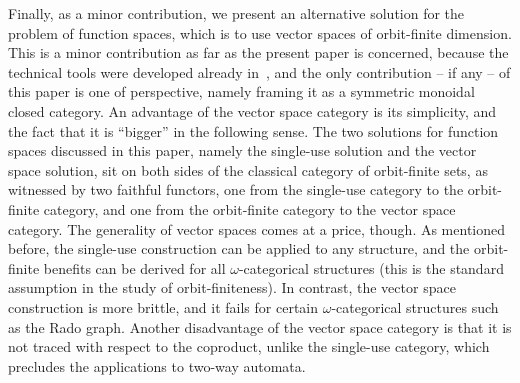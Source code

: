 Finally, as a minor contribution, we present an alternative solution for the problem of function spaces, which is  to use vector spaces of orbit-finite dimension. This is a minor contribution as far as the present paper is concerned, because the technical tools were developed already in~\cite{bojanczykKM21OrbitFiniteVector}, and the only contribution -- if any -- of this paper is one of perspective, namely framing it as a symmetric monoidal closed category. An advantage of the vector space category is its simplicity, and the fact that it is ``bigger'' in the following sense. The two solutions for function spaces discussed in this paper, namely the single-use solution and the vector space solution, sit on both sides of the classical category of orbit-finite sets, as witnessed by two faithful functors, one from the single-use category to the orbit-finite category, and one from the orbit-finite category to the vector space category. 
The generality of vector spaces comes at a price, though. As mentioned before, the single-use construction can be applied to any structure, and the orbit-finite benefits can be derived for all $\omega$-categorical structures (this is the standard assumption in the study of orbit-finiteness). In contrast, the vector space construction is more brittle, and it fails for certain $\omega$-categorical  structures such as the Rado graph.   Another disadvantage of the vector space category is that it is not traced with respect to the coproduct, unlike the single-use category, which precludes the applications to two-way automata.
